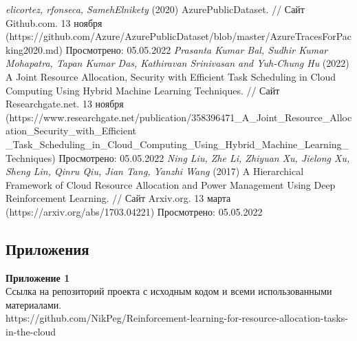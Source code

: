 \documentclass{article}
\newcommand\zz[1]{\par{\normalsize\strut #1} \hfill\ignorespaces}
\begin{document}
\begin{center}
\begin{thebibliography}{}
 \textit{elicortez, rfonseca, SamehElnikety} (2020) AzurePublicDataset. // Сайт Github.com. 13 ноября (https://github.com/Azure/AzurePublicDataset/blob/master/AzureTracesForPacking2020.md) Просмотрено: 05.05.2022
 \textit{Prasanta Kumar Bal, Sudhir Kumar Mohapatra, Tapan Kumar Das, Kathiravan Srinivasan and Yuh-Chung Hu} (2022) A Joint Resource Allocation, Security with Efficient Task Scheduling in Cloud Computing Using Hybrid Machine Learning Techniques. // Сайт Researchgate.net. 13 ноября (https://www.researchgate.net/publication/358396471\_A\_Joint\_Resource\_Allocation\_Security\_with\_Efficient\\\_Task\_Scheduling\_in\_Cloud\_Computing\_Using\_Hybrid\_Machine\_Learning\_Techniques) Просмотрено: 05.05.2022
 \textit{Ning Liu, Zhe Li, Zhiyuan Xu, Jielong Xu, Sheng Lin, Qinru Qiu, Jian Tang, Yanzhi Wang} (2017) A Hierarchical Framework of Cloud Resource Allocation and Power Management Using Deep Reinforcement Learning. // Сайт Arxiv.org. 13 марта (https://arxiv.org/abs/1703.04221) Просмотрено: 05.05.2022
\end{thebibliography}
\end{center}
\newpage
\begin{center}
\section {Приложения}
\end{center}
\zz{}\textbf{Приложение 1\\}
Ссылка на репозиторий проекта с исходным кодом и всеми использованными материалами.\\
https://github.com/NikPeg/Reinforcement-learning-for-resource-allocation-tasks-in-the-cloud\\
\end{document}
